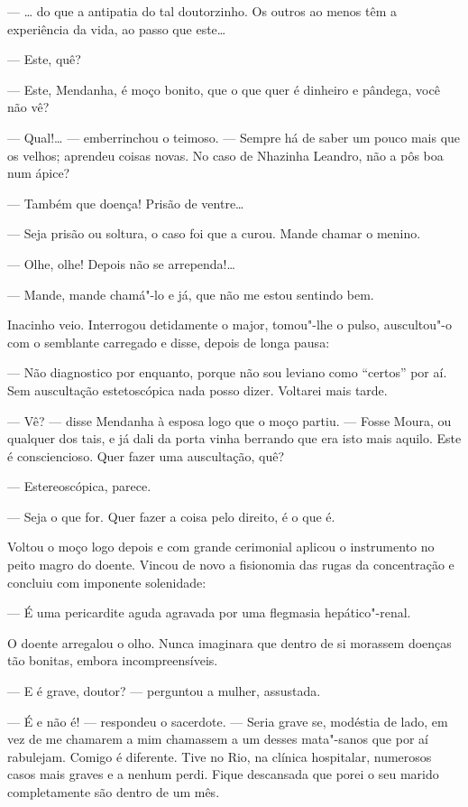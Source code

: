 --- \ldots{} do que a antipatia do tal doutorzinho. Os outros ao menos têm a
experiência da vida, ao passo que este\ldots{}

--- Este, quê?

--- Este, Mendanha, é moço bonito, que o que quer é dinheiro e pândega,
você não vê?

--- Qual!\ldots{} --- emberrinchou o teimoso. --- Sempre há de saber um pouco
mais que os velhos; aprendeu coisas novas. No caso de Nhazinha Leandro,
não a pôs boa num ápice?

--- Também que doença! Prisão de ventre\ldots{}

--- Seja prisão ou soltura, o caso foi que a curou. Mande chamar o
menino.

--- Olhe, olhe! Depois não se arrependa!\ldots{}

--- Mande, mande chamá"-lo e já, que não me estou sentindo bem.

Inacinho veio. Interrogou detidamente o major, tomou"-lhe o pulso,
auscultou"-o com o semblante carregado e disse, depois de longa pausa:

--- Não diagnostico por enquanto, porque não sou leviano como ``certos''
por aí. Sem auscultação estetoscópica nada posso dizer. Voltarei mais
tarde.

--- Vê? --- disse Mendanha à esposa logo que o moço partiu. --- Fosse
Moura, ou qualquer dos tais, e já dali da porta vinha berrando que era
isto mais aquilo. Este é consciencioso. Quer fazer uma auscultação, quê?

--- Estereoscópica, parece.

--- Seja o que for. Quer fazer a coisa pelo direito, é o que é.

Voltou o moço logo depois e com grande cerimonial aplicou o instrumento
no peito magro do doente. Vincou de novo a fisionomia das rugas da
concentração e concluiu com imponente solenidade:

--- É uma pericardite aguda agravada por uma flegmasia hepático"-renal.

O doente arregalou o olho. Nunca imaginara que dentro de si morassem
doenças tão bonitas, embora incompreensíveis.

--- E é grave, doutor? --- perguntou a mulher, assustada.

--- É e não é! --- respondeu o sacerdote. --- Seria grave se, modéstia
de lado, em vez de me chamarem a mim chamassem a um desses mata"-sanos
que por aí rabulejam. Comigo é diferente. Tive no Rio, na clínica
hospitalar, numerosos casos mais graves e a nenhum perdi. Fique
descansada que porei o seu marido completamente são dentro de um mês.

